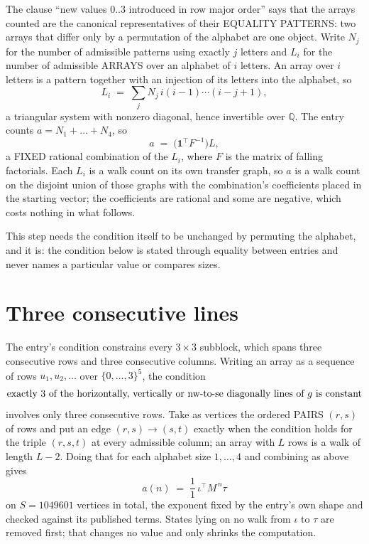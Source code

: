 \documentclass[11pt,a4paper]{article}
\theoremstyle{plain}
\theoremstyle{definition}
\begin{document}
The clause ``new values $0..3$ introduced in row major order'' says that the arrays
counted are the canonical representatives of their EQUALITY PATTERNS: two arrays that differ
only by a permutation of the alphabet are one object. Write $N_j$ for the number of admissible
patterns using exactly $j$ letters and $L_i$ for the number of admissible ARRAYS over an
alphabet of $i$ letters. An array over $i$ letters is a pattern together with an injection of
its letters into the alphabet, so
\[
L_i\;=\;\sum_{j}N_j\,i(i-1)\cdots(i-j+1),
\]
a triangular system with nonzero diagonal, hence invertible over $\mathbb{Q}$. The entry
counts $a=N_1+\dots+N_{4}$, so
\[
a\;=\;\bigl(\mathbf{1}^{\!\top}F^{-1}\bigr)L ,
\]
a FIXED rational combination of the $L_i$, where $F$ is the matrix of falling factorials.
Each $L_i$ is a walk count on its own transfer graph, so $a$ is a walk count on the disjoint
union of those graphs with the combination's coefficients placed in the starting vector; the
coefficients are rational and some are negative, which costs nothing in what follows.

This step needs the condition itself to be unchanged by permuting the alphabet, and it is:
the condition below is stated through equality between entries and never names a particular
value or compares sizes.

\section{Three consecutive lines}

The entry's condition constrains every $3\times3$ subblock, which spans three consecutive
rows and three consecutive columns. Writing an array as a sequence of rows
$u_1,u_2,\dots$ over $\{0,\dots,3\}^{5}$, the condition
\[
\text{exactly }3\text{ of the horizontally, vertically or nw-to-se diagonally lines of }g\text{ \text{is constant}}
\]
involves only three consecutive rows. Take as vertices the ordered PAIRS $(r,s)$ of
rows and put an edge $(r,s)\to(s,t)$ exactly when the condition holds for the triple
$(r,s,t)$ at every admissible column; an array with $L$ rows is a walk of length $L-2$.
Doing that for each alphabet size $1,\dots,4$ and combining as above gives
\[
a(n)\;=\;\frac{1}{1}\,\iota^{\!\top}M^{\,n}\tau
\]
on $S=1049601$ vertices in total, the exponent fixed by the entry's own shape and checked against
its published terms. States lying on no walk from $\iota$ to $\tau$ are removed first; that
changes no value and only shrinks the computation.
\end{document}
